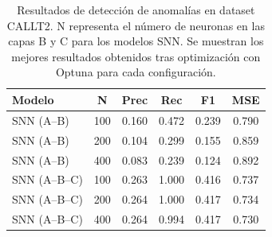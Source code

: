 \begin{table}[htbp]
\centering
\small
\begin{tabular}{lccccc}
\hline\hline
\textbf{Modelo} & \textbf{N} & \textbf{Prec} & \textbf{Rec} & \textbf{F1} & \textbf{MSE} \\
\hline
SNN (A--B) & 100 & 0.160 & 0.472 & 0.239 & 0.790 \\
SNN (A--B) & 200 & 0.104 & 0.299 & 0.155 & 0.859 \\
SNN (A--B) & 400 & 0.083 & 0.239 & 0.124 & 0.892 \\
\hline
SNN (A--B--C) & 100 & 0.263 & 1.000 & 0.416 & 0.737 \\
SNN (A--B--C) & 200 & 0.264 & 1.000 & 0.417 & 0.734 \\
SNN (A--B--C) & 400 & 0.264 & 0.994 & 0.417 & 0.730 \\
\hline\hline
\end{tabular}
\caption{Resultados de detección de anomalías en dataset CALLT2. N representa el número de neuronas en las capas B y C para los modelos SNN. Se muestran los mejores resultados obtenidos tras optimización con Optuna para cada configuración.}
\label{tab:resultados-callt2-escalabilidad}
\end{table}